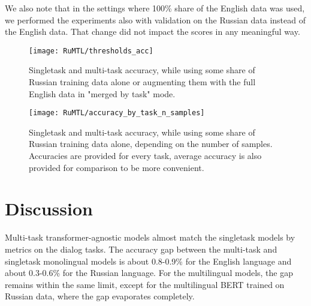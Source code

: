 We also note that in the settings where 100\% share of the English data was used, we performed the experiments also with validation on the Russian data instead of the English data. That change did not impact the scores in any meaningful way.

\begin{figure}[ht]
    \texttt{[image: RuMTL/thresholds\_acc]}
  \caption{Singletask and multi-task accuracy, while using some share of Russian training data alone or augmenting them with the full English data in "merged by task" mode.}\label{fig:thresholds_acc}
\end{figure}
\begin{figure}[ht]
    \texttt{[image: RuMTL/accuracy\_by\_task\_n\_samples]}
  \caption{Singletask and multi-task accuracy, while using some share of Russian training data alone, depending on the number of samples. Accuracies are provided for every task, average accuracy is also provided for comparison to be more convenient.}\label{fig:accuracy_by_task_n_samples}
\end{figure}


\section{Discussion}
Multi-task transformer-agnostic models almost match the singletask models by metrics on the dialog tasks. The accuracy gap between the multi-task and singletask monolingual models is about 0.8-0.9\% for the English language and about 0.3-0.6\% for the Russian language. For the multilingual models, the gap remains within the same limit, except for the multilingual BERT trained on Russian data, where the gap evaporates completely.


